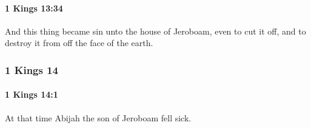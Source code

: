 		\paragraph{1 Kings 13:34} %
			\label{1KINGS-13-34}

			And this thing became sin unto the house of Jeroboam, even to cut it off, and to destroy it from off the face of the earth.

	\subsubsection{1 Kings 14} %
		\label{1KINGS-14}

		\paragraph{1 Kings 14:1} %
			\label{1KINGS-14-1}

			At that time Abijah the son of Jeroboam fell sick.

